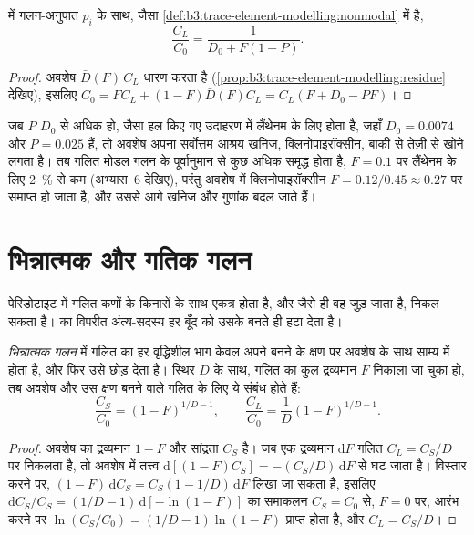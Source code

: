 \begin{proposition}[अ-मोडल बैच गलन]\label{prop:b3:trace-element-modelling:nonmodal}
 में गलन-अनुपात $p_i$ के साथ, जैसा \cref{def:b3:trace-element-modelling:nonmodal} में है,
\[
\frac{C_L}{C_0} = \frac{1}{D_0 + F(1 - P)}.
\]
\end{proposition}

\begin{proof}
अवशेष $\bar D(F)\,C_L$ धारण करता है (\cref{prop:b3:trace-element-modelling:residue} देखिए),
इसलिए $C_0 = FC_L + (1 - F)\bar D(F)C_L = C_L(F + D_0 - PF)$।
\end{proof}

जब $P$ $D_0$ से अधिक हो, जैसा हल किए गए उदाहरण में लैंथेनम के लिए होता है, जहाँ $D_0 =
0.0074$ और $P = 0.025$ हैं, तो अवशेष अपना सर्वोत्तम आश्रय खनिज, क्लिनोपाइरॉक्सीन, बाकी से तेज़ी से खोने लगता है।
तब गलित मोडल गलन के पूर्वानुमान से कुछ अधिक समृद्ध होता है,
$F = 0.1$ पर लैंथेनम के लिए \qty{2}{\percent} से कम (अभ्यास~6 देखिए), परंतु
अवशेष में क्लिनोपाइरॉक्सीन $F = 0.12/0.45 \approx 0.27$ पर समाप्त हो जाता है, और उससे आगे
खनिज और गुणांक बदल जाते हैं।

\section{भिन्नात्मक और गतिक गलन}\label{sec:b3:trace-element-modelling:fractional}

पेरिडोटाइट में गलित कणों के किनारों के साथ एकत्र होता है, और जैसे ही वह
जुड़ जाता है, निकल सकता है।  का विपरीत अंत्य-सदस्य हर बूँद को उसके
बनते ही हटा देता है।

\begin{theorem}[भिन्नात्मक गलन]\label{thm:b3:trace-element-modelling:fractional}
\emph{भिन्नात्मक गलन} में गलित का हर वृद्धिशील भाग
केवल अपने बनने के क्षण पर अवशेष के साथ साम्य में होता है, और फिर
उसे छोड़ देता है। स्थिर $D$ के साथ, गलित का कुल द्रव्यमान $F$ निकाला जा चुका हो, तब
अवशेष और उस क्षण बनने वाले गलित के लिए ये संबंध होते हैं:
\[
\frac{C_S}{C_0} = (1 - F)^{1/D - 1}, \qquad
\frac{C_L}{C_0} = \frac{1}{D}(1 - F)^{1/D - 1}.
\]
\end{theorem}

\begin{proof}
अवशेष का द्रव्यमान $1 - F$ और सांद्रता $C_S$ है। जब एक द्रव्यमान
$\mathrm dF$ गलित $C_L = C_S/D$ पर निकलता है, तो अवशेष में तत्त्व
$\mathrm d[(1 - F)C_S] = -(C_S/D)\,\mathrm dF$ से घट जाता है। विस्तार करने पर,
$(1 - F)\,\mathrm dC_S = C_S(1 - 1/D)\,\mathrm dF$ लिखा जा सकता है, इसलिए
$\mathrm dC_S/C_S = (1/D - 1)\,\mathrm d[-\ln(1 - F)]$ का समाकलन
$C_S = C_0$ से, $F = 0$ पर, आरंभ करने पर $\ln(C_S/C_0) = (1/D - 1)\ln(1 - F)$ प्राप्त होता है, और
$C_L = C_S/D$।
\end{proof}

